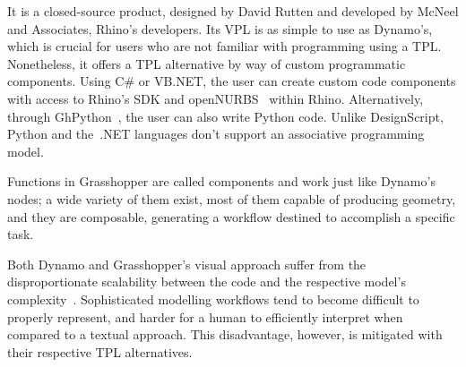 It is a closed-source product, designed by David Rutten and developed by McNeel
and Associates, Rhino's developers.  Its \ac{VPL} is as simple to use as
Dynamo's, which is crucial for users who are not familiar with programming using
a \ac{TPL}.  Nonetheless, it offers a \ac{TPL} alternative by way of custom
programmatic components.  Using C\# or VB.NET, the user can create custom code
components with access to Rhino's \ac{SDK} and
openNURBS~\cite{Lear:2018:openNURBS} within Rhino.  Alternatively, through
GhPython~\cite{Giulio:2017:GhPython}, the user can also write Python code.
Unlike DesignScript, Python and the~.NET languages don't support an associative
programming model.

Functions in Grasshopper are called components and work just like Dynamo's
nodes; a wide variety of them exist, most of them capable of producing geometry,
and they are composable, generating a workflow destined to accomplish a specific
task.

Both Dynamo and Grasshopper's visual approach suffer from the disproportionate
scalability between the code and the respective model's
complexity~\cite{Leitao:2013:PESLGD}.  Sophisticated modelling workflows tend to
become difficult to properly represent, and harder for a human to efficiently
interpret when compared to a textual approach.  This disadvantage, however, is
mitigated with their respective \ac{TPL} alternatives.
